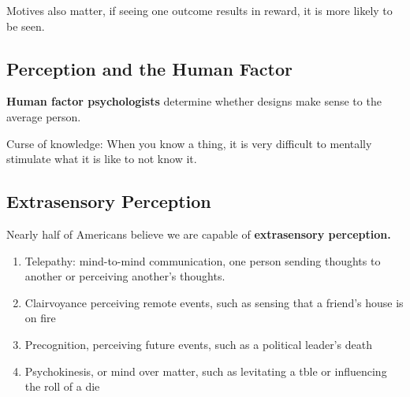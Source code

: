 \documentclass[12pt]{article}
\begin{document}
Motives also matter, if seeing one outcome results in reward, it is more likely to be seen.

\subsection*{Perception and the Human Factor}
\textbf{Human factor psychologists} determine whether designs make sense to the average person. 

Curse of knowledge: When you know a thing, it is very difficult to mentally stimulate what it is like to not know it. 

\subsection*{Extrasensory Perception}
Nearly half of Americans believe we are capable of \textbf{extrasensory perception.} 
\begin{enumerate}
\item Telepathy: mind-to-mind communication, one person sending thoughts to another or perceiving another's thoughts.
\item Clairvoyance perceiving remote events, such as sensing that a friend's house is on fire
\item Precognition, perceiving future events, such as a political leader's death
\item Psychokinesis, or mind over matter, such as levitating a tble or influencing the roll of a die
\end{enumerate} 
\end{document}
